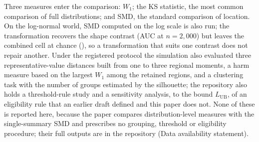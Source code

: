 \documentclass[AMA,Times1COL]{WileyNJDv5}
\begin{document}
Three measures enter the comparison: $W_1$; the KS statistic, the most common comparison of full distributions; and SMD, the standard comparison of location. On the log-normal world, SMD computed on the log scale is also run; the transformation recovers the shape contrast (AUC  at $n = 2{,}000$) but leaves the combined cell at chance (), so a transformation that suits one contrast does not repair another. Under the registered protocol the simulation also evaluated three representative-value distances built from one to three regional moments, a harm measure based on the largest $W_1$ among the retained regions, and a clustering task with the number of groups estimated by the silhouette; the repository also holds a threshold-rule study and a sensitivity analysis, to the bound $L_{\text{UB}}$, of an eligibility rule that an earlier draft defined and this paper does not. None of these is reported here, because the paper compares distribution-level measures with the single-summary SMD and prescribes no grouping, threshold or eligibility procedure; their full outputs are in the repository (Data availability statement).
\end{document}
